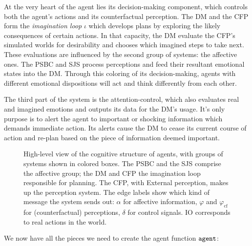 At the very heart of the agent lies its decision-making component, which controls both the agent's actions and its counterfactual perception. The DM and the CFP form the {\em imagination loop} $\iota$ which develops plans by exploring the likely consequences of certain actions. In that capacity, the DM evaluate the CFP's simulated worlds for desirability and chooses which imagined steps to take next. These evaluations are influenced by the second group of systems: the affective ones. The PSBC and SJS process perceptions and feed their resultant emotional states into the DM. Through this coloring of its decision-making, agents with different emotional dispositions will act and think differently from each other.

The third part of the system is the attention-control, which also evaluates real and imagined emotions and outputs its data for the DM's usage. It's only purpose is to alert the agent to important or shocking information which demands immediate action. Its alerts cause the DM to cease its current course of action and re-plan based on the piece of information deemed important.

\begin{figure}
	\centering
	
	\caption{High-level view of the cognitive structure of agents, with groups of systems shown in colored boxes. The PSBC and the SJS comprise the affective group; the DM and CFP the imagination loop responsible for planning. The CFP, with External perception, makes up the perception system. The edge labels show which kind of message the system sends out: $\alpha$ for affective information, $\varphi$ and $\varphi_{\mathrm{cf}}$ for (counterfactual) perceptions, $\delta$ for control signals. IO corresponds to real actions in the world.}
	\label{fig:cognitive_system}
\end{figure}

We now have all the pieces we need to create the agent function $\mathtt{agent}$:

